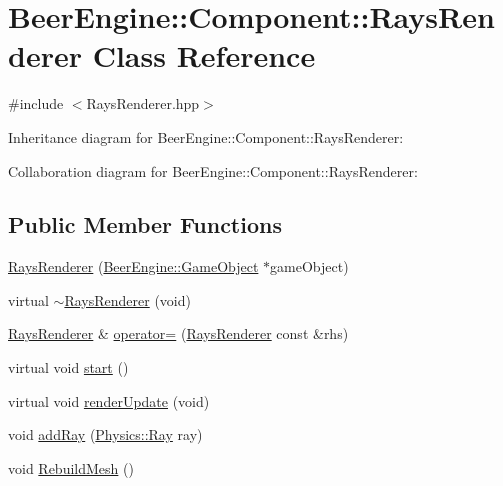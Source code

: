 \hypertarget{class_beer_engine_1_1_component_1_1_rays_renderer}{}\section{Beer\+Engine\+:\+:Component\+:\+:Rays\+Renderer Class Reference}
\label{class_beer_engine_1_1_component_1_1_rays_renderer}


{\ttfamily \#include $<$Rays\+Renderer.\+hpp$>$}



Inheritance diagram for Beer\+Engine\+:\+:Component\+:\+:Rays\+Renderer\+:


Collaboration diagram for Beer\+Engine\+:\+:Component\+:\+:Rays\+Renderer\+:
\subsection*{Public Member Functions}
\begin{DoxyCompactItemize}
\item 
\mbox{\hyperlink{class_beer_engine_1_1_component_1_1_rays_renderer_a0d3637f17a8c0c6e159a52a196834bb6}{Rays\+Renderer}} (\mbox{\hyperlink{class_beer_engine_1_1_game_object}{Beer\+Engine\+::\+Game\+Object}} $\ast$game\+Object)
\item 
virtual \mbox{\hyperlink{class_beer_engine_1_1_component_1_1_rays_renderer_a23d7ca257ec101eef546b51b0d6a6e36}{$\sim$\+Rays\+Renderer}} (void)
\item 
\mbox{\hyperlink{class_beer_engine_1_1_component_1_1_rays_renderer}{Rays\+Renderer}} \& \mbox{\hyperlink{class_beer_engine_1_1_component_1_1_rays_renderer_af7fb2a4d060a59e907580d8689cf4256}{operator=}} (\mbox{\hyperlink{class_beer_engine_1_1_component_1_1_rays_renderer}{Rays\+Renderer}} const \&rhs)
\item 
virtual void \mbox{\hyperlink{class_beer_engine_1_1_component_1_1_rays_renderer_a309d7940148feada1c9497e2444a6548}{start}} ()
\item 
virtual void \mbox{\hyperlink{class_beer_engine_1_1_component_1_1_rays_renderer_a1647c9a5f40fc9186ccb6d55b7ebfe5e}{render\+Update}} (void)
\item 
void \mbox{\hyperlink{class_beer_engine_1_1_component_1_1_rays_renderer_a0597197520e656dde062527344d050e0}{add\+Ray}} (\mbox{\hyperlink{struct_beer_engine_1_1_physics_1_1_ray}{Physics\+::\+Ray}} ray)
\item 
void \mbox{\hyperlink{class_beer_engine_1_1_component_1_1_rays_renderer_ab452c92a57a002fced157ec9913d40c8}{Rebuild\+Mesh}} ()
\end{DoxyCompactItemize}
